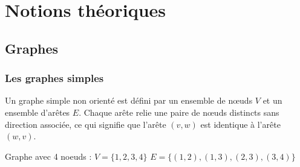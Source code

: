 \documentclass{beamer}
\begin{document}
\section{Notions théoriques}

\subsection{Graphes}
\begin{frame}
\frametitle{Les graphes simples}
\begin{definition}
  Un graphe simple non orienté est défini par un ensemble de nœuds \(V\) et un ensemble d'arêtes \(E\). Chaque arête relie une paire de nœuds distincts sans direction associée, ce qui signifie que l'arête \((v, w)\) est identique à l'arête \((w, v)\).
\end{definition}
\begin{example}
  \begin{multicols}{2}
    Graphe avec 4 noeuds :\vspace*{0.4cm}
      \(V = \{1,2,3,4\}\)
      $E = \{(1,2), (1, 3), (2,3), (3,4)\}$
  \begin{figure}
    \centering
  \end{figure}
  \end{multicols}
\end{example}
\end{frame}
\end{document}
